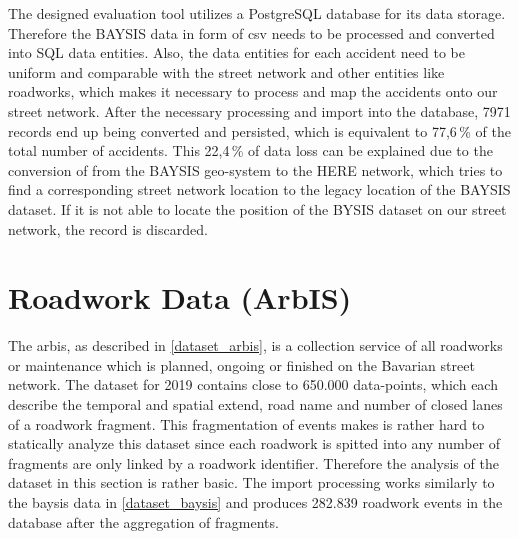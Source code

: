 The designed evaluation tool utilizes a PostgreSQL database for its data storage. Therefore the BAYSIS data in form of \acrfull{csv} needs to be processed and converted into SQL data entities. Also, the data entities for each accident need to be uniform and comparable with the street network and other entities like roadworks, which makes it necessary to process and map the accidents onto our street network. After the necessary processing and import into the database, 7971 records end up being converted and persisted, which is equivalent to 77,6\,\% of the total number of accidents. This 22,4\,\% of data loss can be explained due to the conversion of from the BAYSIS geo-system to the HERE network, which tries to find a corresponding street network location to the legacy location of the BAYSIS dataset. If it is not able to locate the position of the BYSIS dataset on our street network, the record is discarded.

\section{Roadwork Data (ArbIS)}
\label{dataset_arbis}

The \acrfull{arbis}, as described in \autoref{dataset_arbis}, is a collection service of all roadworks or maintenance which is planned, ongoing or finished on the Bavarian street network. The dataset for 2019 contains close to 650.000 data-points, which each describe the temporal and spatial extend, road name and number of closed lanes of a roadwork fragment. This fragmentation of events makes is rather hard to statically analyze this dataset since each roadwork is spitted into any number of fragments are only linked by a roadwork identifier. Therefore the analysis of the dataset in this section is rather basic. The import processing works similarly to the \acrshort{baysis} data in \autoref{dataset_baysis} and produces 282.839 roadwork events in the database after the aggregation of fragments. 

